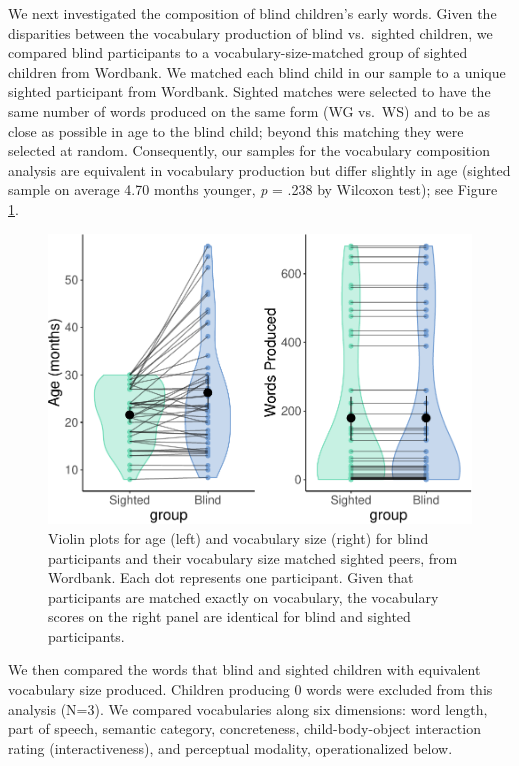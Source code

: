 \documentclass[english,man,floatsintext]{apa6}
\begin{document}
We next investigated the composition of blind children's early words. Given the disparities between the vocabulary production of blind vs.~sighted children, we compared blind participants to a vocabulary-size-matched group of sighted children from Wordbank. We matched each blind child in our sample to a unique sighted participant from Wordbank. Sighted matches were selected to have the same number of words produced on the same form (WG vs.~WS) and to be as close as possible in age to the blind child; beyond this matching they were selected at random. Consequently, our samples for the vocabulary composition analysis are equivalent in vocabulary production but differ slightly in age (sighted sample on average 4.70 months younger, \emph{p} = .238 by Wilcoxon test); see Figure \ref{fig:vocab-match-demo}.

\begin{figure}
\centering
\includegraphics{VI_CDI_manuscript_files/figure-latex/vocab-match-demo-1.pdf}
\caption{\label{fig:vocab-match-demo}Violin plots for age (left) and vocabulary size (right) for blind participants and their vocabulary size matched sighted peers, from Wordbank. Each dot represents one participant. Given that participants are matched exactly on vocabulary, the vocabulary scores on the right panel are identical for blind and sighted participants.}
\end{figure}

We then compared the words that blind and sighted children with equivalent vocabulary size produced. Children producing 0 words were excluded from this analysis (N=3). We compared vocabularies along six dimensions: word length, part of speech, semantic category, concreteness, child-body-object interaction rating (interactiveness), and perceptual modality, operationalized below.
\end{document}
